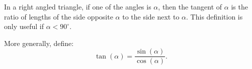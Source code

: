 
In a right angled triangle, if one of the angles is $\alpha$, then the tangent of $\alpha$ is the ratio of lengths of the side opposite $\alpha$ to the side next to $\alpha$. This definition is only useful if $\alpha < 90^\circ$.

More generally, define: 
$$\tan(\alpha) = \frac{\sin(\alpha)}{\cos(\alpha)}.$$

  
  